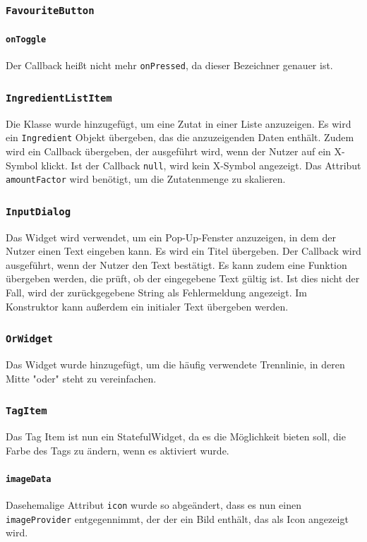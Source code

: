 \documentclass{implementierungsheft}
\begin{document}
\subsubsection*{\texttt{FavouriteButton}}
\paragraph{\texttt{onToggle}}
Der Callback heißt nicht mehr \texttt{onPressed}, da dieser Bezeichner genauer ist.
\subsubsection*{\texttt{IngredientListItem}}
Die Klasse wurde hinzugefügt, um eine Zutat in einer Liste anzuzeigen. Es wird ein \texttt{Ingredient} Objekt übergeben, das die anzuzeigenden Daten enthält. Zudem wird ein Callback übergeben, der ausgeführt wird, wenn der Nutzer auf ein X-Symbol klickt. Ist der Callback \texttt{null}, wird kein X-Symbol angezeigt. Das Attribut \texttt{amountFactor} wird benötigt, um die Zutatenmenge zu skalieren.
\subsubsection*{\texttt{InputDialog}}
Das Widget wird verwendet, um ein Pop-Up-Fenster anzuzeigen, in dem der Nutzer einen Text eingeben kann. Es wird ein Titel übergeben. Der Callback wird ausgeführt, wenn der Nutzer den Text bestätigt. Es kann zudem eine Funktion übergeben werden, die prüft, ob der eingegebene Text gültig ist. Ist dies nicht der Fall, wird der zurückgegebene String als Fehlermeldung angezeigt.
Im Konstruktor kann außerdem ein initialer Text übergeben werden.
\subsubsection*{\texttt{OrWidget}}
Das Widget wurde hinzugefügt, um die häufig verwendete Trennlinie, in deren Mitte "oder" steht zu vereinfachen.
\subsubsection*{\texttt{TagItem}}
Das Tag Item ist nun ein StatefulWidget, da es die Möglichkeit bieten soll, die Farbe des Tags zu ändern, wenn es aktiviert wurde.
\paragraph*{\texttt{imageData}}
Dasehemalige Attribut \texttt{icon} wurde so abgeändert, dass es nun einen \texttt{imageProvider} entgegennimmt, der der ein Bild enthält, das als Icon angezeigt wird.
\end{document}

